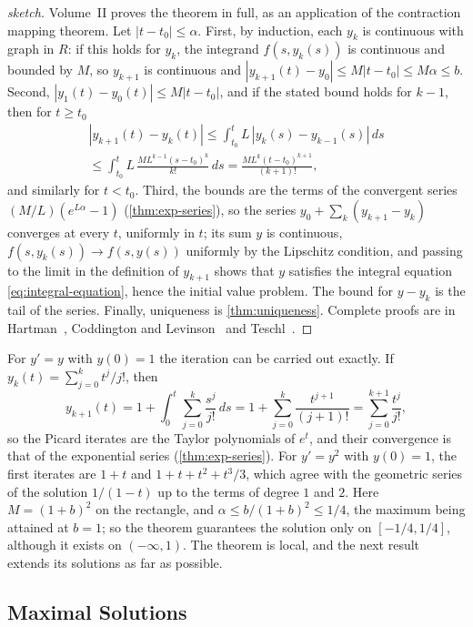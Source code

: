 \begin{proof}[sketch]
Volume~II proves the theorem in full, as an application of the contraction mapping theorem. Let $|t-t_0|\le\alpha$. First, by induction, each $y_k$ is continuous with graph in $R$: if this holds for $y_k$, the integrand $f(s,y_k(s))$ is continuous and bounded by $M$, so $y_{k+1}$ is continuous and $|y_{k+1}(t)-y_0|\le M|t-t_0|\le M\alpha\le b$. Second, $|y_1(t)-y_0(t)|\le M|t-t_0|$, and if the stated bound holds for $k-1$, then for $t\ge t_0$
\begin{multline*}
|y_{k+1}(t)-y_k(t)|\le\int_{t_0}^tL\,|y_k(s)-y_{k-1}(s)|\,ds\\\le\int_{t_0}^tL\,\frac{ML^{k-1}(s-t_0)^k}{k!}\,ds=\frac{ML^k(t-t_0)^{k+1}}{(k+1)!},
\end{multline*}
and similarly for $t<t_0$. Third, the bounds are the terms of the convergent series $(M/L)(e^{L\alpha}-1)$ (\cref{thm:exp-series}), so the series $y_0+\sum_k(y_{k+1}-y_k)$ converges at every $t$, uniformly in $t$; its sum $y$ is continuous, $f(s,y_k(s))\to f(s,y(s))$ uniformly by the Lipschitz condition, and passing to the limit in the definition of $y_{k+1}$ shows that $y$ satisfies the integral equation \eqref{eq:integral-equation}, hence the initial value problem. The bound for $y-y_k$ is the tail of the series. Finally, uniqueness is \cref{thm:uniqueness}. Complete proofs are in Hartman~\cite[Chap.~II]{hartman2002}, Coddington and Levinson~\cite[Chap.~1]{coddington1955} and Teschl~\cite[Chap.~2]{teschl2012}.
\end{proof}

For $y'=y$ with $y(0)=1$ the iteration can be carried out exactly. If $y_k(t)=\sum_{j=0}^kt^j/j!$, then
\[
y_{k+1}(t)=1+\int_0^t\sum_{j=0}^k\frac{s^j}{j!}\,ds=1+\sum_{j=0}^k\frac{t^{j+1}}{(j+1)!}=\sum_{j=0}^{k+1}\frac{t^j}{j!} ,
\]
so the Picard iterates are the Taylor polynomials of $e^t$, and their convergence is that of the exponential series (\cref{thm:exp-series}). For $y'=y^2$ with $y(0)=1$, the first iterates are $1+t$ and $1+t+t^2+t^3/3$, which agree with the geometric series of the solution $1/(1-t)$ up to the terms of degree $1$ and $2$. Here $M=(1+b)^2$ on the rectangle, and $\alpha\le b/(1+b)^2\le1/4$, the maximum being attained at $b=1$; so the theorem guarantees the solution only on $[-1/4,1/4]$, although it exists on $(-\infty,1)$. The theorem is local, and the next result extends its solutions as far as possible.

\subsection{Maximal Solutions}

